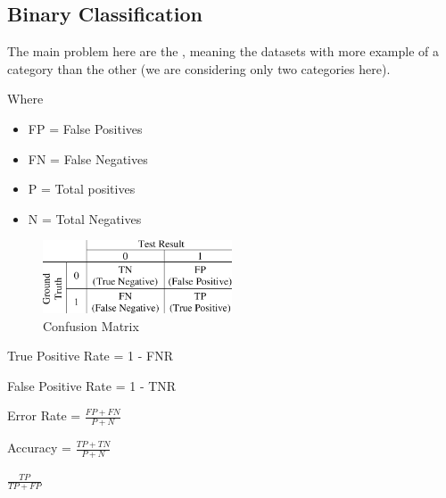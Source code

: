 \subsection{Binary Classification}

The main problem here are the , meaning the datasets with more example of a category than the other (we are considering only two categories here).

Where
\begin{itemize}
    \item FP = False Positives 
    \item FN = False Negatives 
    \item P = Total positives 
    \item N = Total Negatives 
\end{itemize}

\begin{center}
    \begin{figure}[H]
        \centering
        \includegraphics[width=0.5\textwidth]{assets/fig5.png}
        \caption{Confusion Matrix}
    \end{figure}
\end{center}

 True Positive Rate = 1 - FNR

 False Positive Rate = 1 - TNR

 Error Rate = $\frac{FP + FN}{P + N}$

 Accuracy = $\frac{TP + TN}{P + N}$


 $\frac{TP}{TP + FP}$

